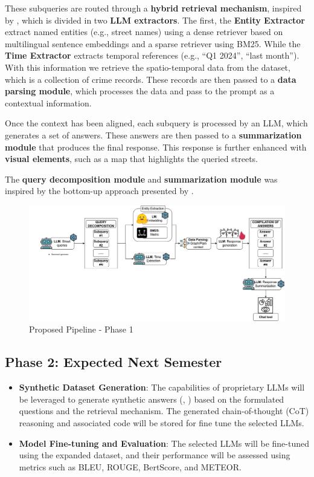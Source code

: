 These subqueries are routed through a \textbf{hybrid retrieval mechanism}, inspired by \cite{Guo2024LightRAG}, which is divided in two \textbf{LLM extractors}. The first, the \textbf{Entity Extractor} extract named entities (e.g., street names) using a dense retriever based on multilingual sentence embeddings and a sparse retriever using BM25. While the \textbf{Time Extractor} extracts temporal references (e.g., “Q1 2024”, “last month”). With this information we retrieve the spatio-temporal data from the dataset, which is a collection of crime records. These records are then passed to a \textbf{data parsing module}, which processes the data and pass to the prompt as a contextual information. 

Once the context has been aligned, each subquery is processed by an LLM, which generates a set of answers. These answers are then passed to a \textbf{summarization module} that produces the final response. This response is further enhanced with \textbf{visual elements}, such as a map that highlights the queried streets.

The \textbf{query decomposition module} and \textbf{summarization module} was inspired by the bottom-up approach presented by \cite{Deng2025VisualChronicles}.

\begin{figure}[H]
    \centering
    \includegraphics[width=\textwidth]{images/PFC3.drawio.png}
    \caption{Proposed Pipeline - Phase 1}
    \label{fig:proposal_f1}
\end{figure}

\subsection{Phase 2: Expected Next Semester}

\begin{itemize}
    \item \textbf{Synthetic Dataset Generation}: The capabilities of proprietary LLMs will be leveraged to generate synthetic answers (\cite{Nvidia2024KaggleMath}, \cite{Liu2024NLDriven}) based on the formulated questions and the retrieval mechanism. The generated chain-of-thought (CoT) reasoning and associated code will be stored for fine tune the selected LLMs.
    \item \textbf{Model Fine-tuning and Evaluation}: The selected LLMs will be fine-tuned using the expanded dataset, and their performance will be assessed using metrics such as BLEU, ROUGE, BertScore, and METEOR.
\end{itemize}


